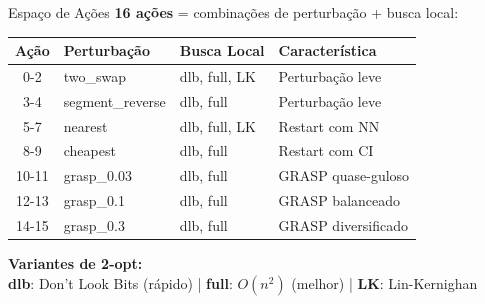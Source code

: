\documentclass[11pt, xcolor=dvipsnames]{beamer}
\begin{document}
\begin{frame}{Espaço de Ações}
  \footnotesize
  \textbf{16 ações} = combinações de perturbação + busca local:
  \vspace{2mm}

  \centering
  \renewcommand{\arraystretch}{1.1}
  \begin{tabular}{clll}
    \toprule
    \textbf{Ação} & \textbf{Perturbação} & \textbf{Busca Local} & \textbf{Característica} \\
    \midrule
    0-2 & two\_swap & dlb, full, LK & Perturbação leve \\
    3-4 & segment\_reverse & dlb, full & Perturbação leve \\
    5-7 & nearest & dlb, full, LK & Restart com NN \\
    8-9 & cheapest & dlb, full & Restart com CI \\
    10-11 & grasp\_0.03 & dlb, full & GRASP quase-guloso \\
    12-13 & grasp\_0.1 & dlb, full & GRASP balanceado \\
    14-15 & grasp\_0.3 & dlb, full & GRASP diversificado \\
    \bottomrule
  \end{tabular}
  \vspace{3mm}

  \begin{alertbox}
    {\scriptsize
    \textbf{Variantes de 2-opt:} \\
    \textbf{dlb}: Don't Look Bits (rápido) | \textbf{full}: $O(n^2)$ (melhor) | \textbf{LK}: Lin-Kernighan
    }
  \end{alertbox}
\end{frame}
\end{document}
